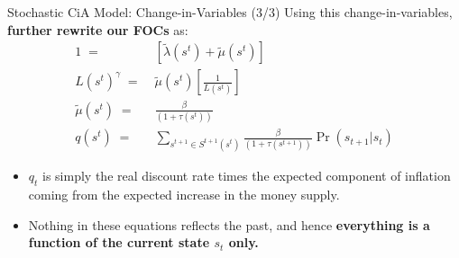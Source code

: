 \documentclass[10pt,c,aspectratio=1610,handout]{beamer}
\begin{document}
\begin{frame}{Stochastic CiA Model: Change-in-Variables (3/3)}%
  Using this change-in-variables, \textbf{further rewrite our FOCs} as:%
  \begin{align}%
    1 \; = & \; \left[ \tilde{\lambda}(s^{t})+\tilde{\mu}(s^{t})\right]\\%
    L(s^{t})^{\gamma} \; = & \; \tilde{\mu}(s^{t})\left[ \frac{1}{L(s^{t})}\right]\\%
    \tilde{\mu}(s^{t}) \; = & \; \frac{\beta}{(1+\tau(s^{t}))}\label{eq:foc_money}\\%
    q(s^t) \; = & \; \sum_{s^{t+1}\in S^{t+1}(s^{t})} \frac{\beta}{(1+\tau(s^{t+1}))}\Pr(s_{t+1}|s_t)%
  \end{align}%
  \pause%
  \begin{itemize}%
    \item[$\blacktriangleright$] $q_t$ is simply the real discount rate times the expected component of inflation coming from the expected increase in the money supply.%
    \pause%
    \item[$\blacktriangleright$] Nothing in these equations reflects the past, and hence \textbf{everything is a function of the current state $s_t$ only.}%
  \end{itemize}%
\end{frame}%
\end{document}
